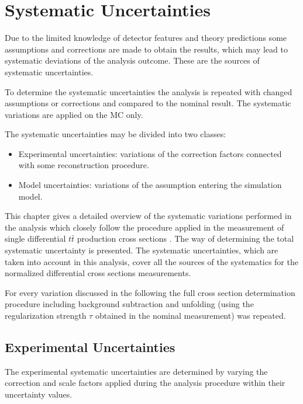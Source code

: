 \chapter{Systematic Uncertainties}\label{chapt:syst}

Due to the limited knowledge of detector features and theory predictions some assumptions and corrections are
made to obtain the results, which may lead to systematic deviations of the analysis outcome.
These are the sources of systematic uncertainties.

To determine the systematic uncertainties the analysis is repeated with changed assumptions or corrections and compared
to the nominal result. The systematic variations are applied on the MC only.

The systematic uncertainties may be divided into two classes:
\begin{itemize}
 \item Experimental uncertainties: variations of the correction factors connected with some reconstruction procedure.
 \item Model uncertainties: variations of the assumption entering the simulation model.
\end{itemize}

This chapter gives a detailed overview of the systematic variations performed in the analysis which closely follow the
procedure applied in the measurement of single differential $t\bar{t}$ production cross sections \cite{Asin2014Auth}. 
The way of determining the total systematic uncertainty is presented. The systematic uncertainties, which are taken into
account in this analysis, cover all the sources of the systematics for the normalized differential cross sections 
measurements. 

For every variation discussed in the following the full cross section determination procedure including background subtraction 
and unfolding (using the regularization strength $\tau$ obtained in the nominal measurement) was repeated.

\section{Experimental Uncertainties}

The experimental systematic uncertainties are determined by varying the correction and scale factors applied during the
analysis procedure within their uncertainty values.

